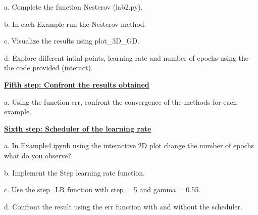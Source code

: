 \documentclass{article}
\newcommand{\step}[1]{\underline{\textbf{\large{#1}}} }
\begin{document}
    a. Complete the function Nesterov (lab2.py).

    b. In each Example run the Nesterov method.

    c. Visualize the results using plot\_3D\_GD.

    d. Explore different intial points, learning rate and number of epochs using the the code provided (interact).

\begin{center}\step{Fifth step: Confront the results obtained}\end{center}
  
      a. Using the function err, confront the convergence of the methods for each example.
  
\begin{center} \step{Sixth step: Scheduler of the learning rate}\end{center}

    a. In Example4.ipynb using the interactive 2D plot change the number of epochs what do you observe?

    b. Implement the Step learning rate function.

    c. Use the step\_LR function with step = 5 and gamma = 0.55.

    d. Confront the result using the err function with and without the scheduler.
  
\end{document}
